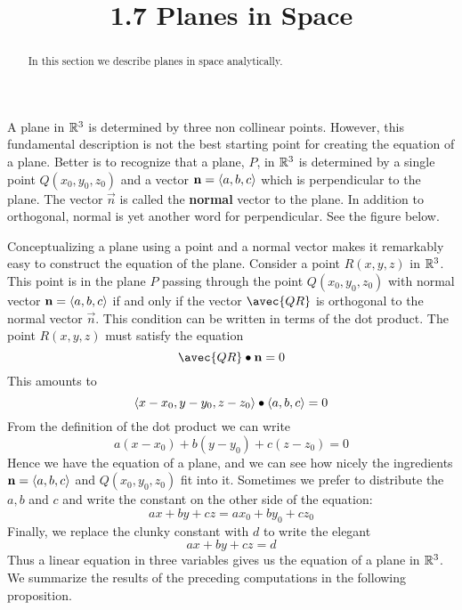 \documentclass[handout]{ximera}
\title{1.7 Planes in Space}
\begin{document}
\begin{abstract}
In this section we describe planes in space analytically.
\end{abstract}
 
\maketitle

A plane in $\mathbb R^3$ is determined by three non collinear points. 
However, this fundamental description is not the best starting point for creating the equation of a plane.
Better is to recognize that a plane, $P$, in $\mathbb R^3$ is determined by a single point $Q(x_0, y_0, z_0)$ and a 
vector $\mathbf{n} = \left\langle a, b, c\right\rangle$ which is perpendicular to the plane. 
The vector $\vec{n}$ is called the {\bf normal} vector to the plane.
In addition to orthogonal, normal is yet another word for perpendicular.
See the figure below.

\begin{image}
\end{image}

Conceptualizing a plane using a point and a normal vector makes it remarkably easy to construct the equation of the plane.
Consider a point $R(x, y, z)$ in $\mathbb R^3$.
This point is in the plane $P$ passing through the point $Q(x_0, y_0, z_0)$ with normal vector $\mathbf{n} =\left\langle a, b, c\right\rangle$
if and only if the vector $\avec{QR}$ is orthogonal to the normal vector $\vec{n}$.
This condition can be written in terms of the dot product.
The point $R(x, y, z)$ must satisfy the equation
\[
\avec{QR} \dotp \vec{n} = 0
\]
This amounts to 
\[
\left\langle x - x_0, y-y_0, z-z_0\right\rangle \bullet \left\langle a, b, c\right\rangle = 0
\]
From the definition of the dot product we can write
\[
a(x-x_0) + b(y-y_0) + c(z-z_0) = 0
\]
Hence we have the equation of a plane, and we can see how nicely the ingredients $\mathbf{n} = \left\langle a,b,c\right\rangle$
and $Q(x_0, y_0, z_0)$ fit into it.
Sometimes we prefer to distribute the $a, b$ and $c$ and write the constant on the other side of the equation:
\[
ax + by + cz = ax_0 + by_0 + cz_0
\]
Finally, we replace the clunky constant with $d$ to write the elegant
\[
ax + by + cz = d
\]
Thus a linear equation in three variables gives us the equation of a plane in $\mathbb R^3$.
We summarize the results of the preceding computations in the following proposition.
\end{document}
